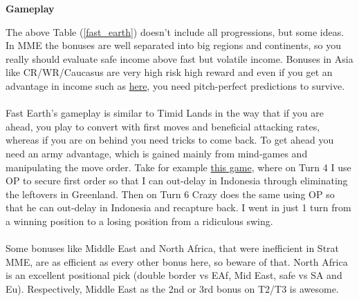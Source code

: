 \textbf{Gameplay} 

The above Table (\ref{fast_earth}) doesn't include all progressions, but some ideas. In MME the bonuses are well separated into big regions and continents, so you really should evaluate safe income above fast but volatile income. Bonuses in Asia like CR/WR/Caucasus are very high risk high reward and even if you get an advantage in income such as \href{https://www.warzone.com/MultiPlayer?GameID=36940240}{here}, you need pitch-perfect predictions to survive.
\\
\\
Fast Earth's gameplay is similar to Timid Lands in the way that if you are ahead, you play to convert with first moves and beneficial attacking rates, whereas if you are on behind you need tricks to come back. To get ahead you need an army advantage, which is gained mainly from mind-games and manipulating the move order. Take for example \href{https://www.warzone.com/MultiPlayer?GameID=37803798}{this game}, where on Turn 4 I use OP to secure first order so that I can out-delay in Indonesia through eliminating the leftovers in Greenland. Then on Turn 6 Crazy does the same using OP so that he can out-delay in Indonesia and recapture back. I went in just 1 turn from a winning position to a losing position from a ridiculous swing. 
\\
\\
Some bonuses like Middle East and North Africa, that were inefficient in Strat MME, are as efficient as every other bonus here, so beware of that. North Africa is an excellent positional pick (double border vs EAf, Mid East, safe vs SA and Eu). Respectively, Middle East as the 2nd or 3rd bonus on T2/T3 is awesome.